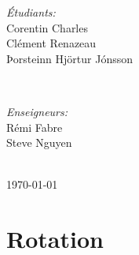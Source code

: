 \documentclass[11pt, a4paper]{article}
\begin{document}
\begin{titlepage}
\begin{minipage}{0.4\textwidth} %
\begin{flushleft} \large %
\emph{Étudiants:}
\\
Corentin Charles
\\
Clément Renazeau
\\
Þorsteinn Hjörtur Jónsson %
\end{flushleft}
\end{minipage}
~
\begin{minipage}{0.4\textwidth}
\begin{flushright} \large %
\vspace{-1cm}
\emph{Enseigneurs:} 
\\
Rémi Fabre
\\
Steve Nguyen
\end{flushright}
\end{minipage}\\[3cm]
\nopagebreak      %
{\large \today}\\[3cm] %
\null
\end{titlepage}
\clearpage
\section{Rotation}
\end{document}
